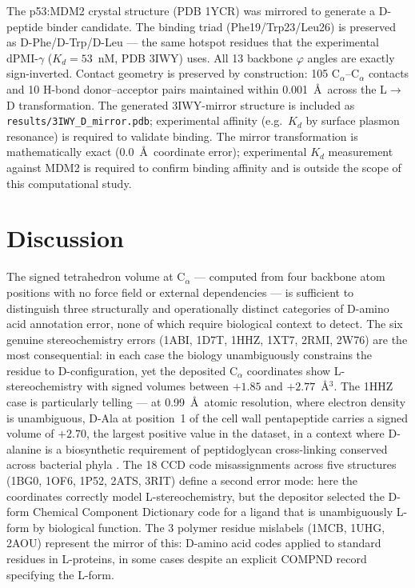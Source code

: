 \documentclass[11pt]{article}
\begin{document}
The p53:MDM2 crystal structure (PDB 1YCR) was mirrored to generate a D-peptide binder candidate. The binding triad (Phe19/Trp23/Leu26) is preserved as D-Phe/D-Trp/D-Leu --- the same hotspot residues that the experimental dPMI-$\gamma$ ($K_d=53$~nM, PDB 3IWY) uses. All 13 backbone $\varphi$ angles are exactly sign-inverted. Contact geometry is preserved by construction: 105 C$_\alpha$--C$_\alpha$ contacts and 10 H-bond donor--acceptor pairs maintained within 0.001~\AA\ across the L$\to$D transformation. The generated 3IWY-mirror structure is included as \texttt{results/3IWY\_D\_mirror.pdb}; experimental affinity (e.g.\ $K_d$ by surface plasmon resonance) is required to validate binding. The mirror transformation is mathematically exact (0.0~\AA\ coordinate error); experimental $K_d$ measurement against MDM2 is required to confirm binding affinity and is outside the scope of this computational study.

\section{Discussion}

The signed tetrahedron volume at C$_\alpha$ --- computed from four backbone atom positions with no force field or external dependencies --- is sufficient to distinguish three structurally and operationally distinct categories of D-amino acid annotation error, none of which require biological context to detect. The six genuine stereochemistry errors (1ABI, 1D7T, 1HHZ, 1XT7, 2RMI, 2W76) are the most consequential: in each case the biology unambiguously constrains the residue to D-configuration, yet the deposited C$_\alpha$ coordinates show L-stereochemistry with signed volumes between $+1.85$ and $+2.77$~\AA$^3$. The 1HHZ case is particularly telling --- at 0.99~\AA\ atomic resolution, where electron density is unambiguous, D-Ala at position~1 of the cell wall pentapeptide carries a signed volume of $+2.70$, the largest positive value in the dataset, in a context where D-alanine is a biosynthetic requirement of peptidoglycan cross-linking conserved across bacterial phyla \citep{miyamoto2021,cava2011}. The 18 CCD code misassignments across five structures (1BG0, 1OF6, 1P52, 2ATS, 3RIT) define a second error mode: here the coordinates correctly model L-stereochemistry, but the depositor selected the D-form Chemical Component Dictionary code for a ligand that is unambiguously L-form by biological function. The 3 polymer residue mislabels (1MCB, 1UHG, 2AOU) represent the mirror of this: D-amino acid codes applied to standard residues in L-proteins, in some cases despite an explicit COMPND record specifying the L-form.
\end{document}
